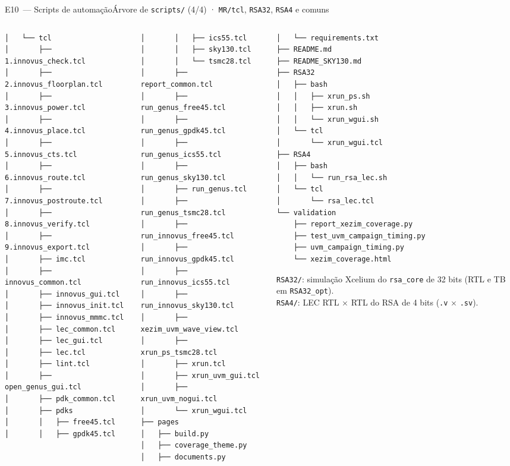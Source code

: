 \documentclass[aspectratio=169,10pt,t]{beamer}
\newcommand{\tmTree}{\fontsize{5.2}{6.1}\selectfont}
\begin{document}
\begin{frame}[fragile]{E10~— Scripts de automação}{Árvore de \texttt{scripts/} (4/4) · \texttt{MR/tcl}, \texttt{RSA32}, \texttt{RSA4} e comuns}
  \vspace*{-0.3cm}
  \begin{columns}[T]
    \begin{column}{0.32\textwidth}
\tmTree
\begin{verbatim}
│   └── tcl
│       ├── 1.innovus_check.tcl
│       ├── 2.innovus_floorplan.tcl
│       ├── 3.innovus_power.tcl
│       ├── 4.innovus_place.tcl
│       ├── 5.innovus_cts.tcl
│       ├── 6.innovus_route.tcl
│       ├── 7.innovus_postroute.tcl
│       ├── 8.innovus_verify.tcl
│       ├── 9.innovus_export.tcl
│       ├── imc.tcl
│       ├── innovus_common.tcl
│       ├── innovus_gui.tcl
│       ├── innovus_init.tcl
│       ├── innovus_mmmc.tcl
│       ├── lec_common.tcl
│       ├── lec_gui.tcl
│       ├── lec.tcl
│       ├── lint.tcl
│       ├── open_genus_gui.tcl
│       ├── pdk_common.tcl
│       ├── pdks
│       │   ├── free45.tcl
│       │   ├── gpdk45.tcl
\end{verbatim}
    \end{column}
    \begin{column}{0.32\textwidth}
\tmTree
\begin{verbatim}
│       │   ├── ics55.tcl
│       │   ├── sky130.tcl
│       │   └── tsmc28.tcl
│       ├── report_common.tcl
│       ├── run_genus_free45.tcl
│       ├── run_genus_gpdk45.tcl
│       ├── run_genus_ics55.tcl
│       ├── run_genus_sky130.tcl
│       ├── run_genus.tcl
│       ├── run_genus_tsmc28.tcl
│       ├── run_innovus_free45.tcl
│       ├── run_innovus_gpdk45.tcl
│       ├── run_innovus_ics55.tcl
│       ├── run_innovus_sky130.tcl
│       ├── xezim_uvm_wave_view.tcl
│       ├── xrun_ps_tsmc28.tcl
│       ├── xrun.tcl
│       ├── xrun_uvm_gui.tcl
│       ├── xrun_uvm_nogui.tcl
│       └── xrun_wgui.tcl
├── pages
│   ├── build.py
│   ├── coverage_theme.py
│   ├── documents.py
\end{verbatim}
    \end{column}
    \begin{column}{0.32\textwidth}
\tmTree
\begin{verbatim}
│   └── requirements.txt
├── README.md
├── README_SKY130.md
├── RSA32
│   ├── bash
│   │   ├── xrun_ps.sh
│   │   ├── xrun.sh
│   │   └── xrun_wgui.sh
│   └── tcl
│       └── xrun_wgui.tcl
├── RSA4
│   ├── bash
│   │   └── run_rsa_lec.sh
│   └── tcl
│       └── rsa_lec.tcl
└── validation
    ├── report_xezim_coverage.py
    ├── test_uvm_campaign_timing.py
    ├── uvm_campaign_timing.py
    └── xezim_coverage.html
\end{verbatim}
      \vspace{0.05cm}
      {\tiny
      \texttt{RSA32/}: simulação Xcelium do \texttt{rsa\_core} de 32 bits (RTL e TB em \texttt{RSA32\_opt}).\\[0.05cm]
      \texttt{RSA4/}: LEC RTL $\times$ RTL do RSA de 4 bits (\texttt{.v} $\times$ \texttt{.sv}).\par}
    \end{column}
  \end{columns}
\end{frame}
\end{document}
